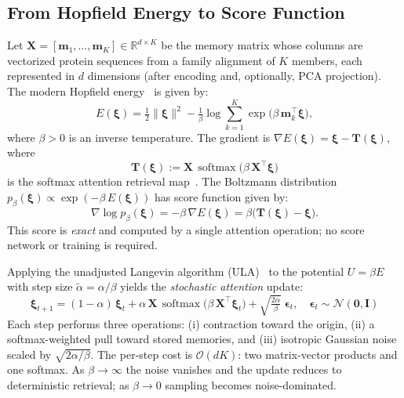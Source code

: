 
\subsection{From Hopfield Energy to Score Function}
Let $\mathbf{X} = [\mathbf{m}_1, \dots, \mathbf{m}_K] \in \mathbb{R}^{d \times K}$ be the memory matrix whose columns are vectorized protein sequences from a family alignment of $K$ members, each represented in $d$ dimensions (after encoding and, optionally, PCA projection). The modern Hopfield energy~\cite{ramsauerHopfieldNetworksAll2021} is given by:
\begin{equation}\label{eq:hopfield-energy}
    E(\boldsymbol{\xi}) = \tfrac{1}{2}\|\boldsymbol{\xi}\|^2 - \tfrac{1}{\beta}\log\sum_{k=1}^{K} \exp\!\bigl(\beta\,\mathbf{m}_k^\top \boldsymbol{\xi}\bigr),
\end{equation}
where $\beta > 0$ is an inverse temperature. The gradient is $\nabla E(\boldsymbol{\xi}) = \boldsymbol{\xi} - \mathbf{T}(\boldsymbol{\xi})$, where
\begin{equation}\label{eq:retrieval-map}
    \mathbf{T}(\boldsymbol{\xi}) := \mathbf{X}\,\operatorname{softmax}\!\bigl(\beta\,\mathbf{X}^\top\boldsymbol{\xi}\bigr)
\end{equation}
is the softmax attention retrieval map~\cite{ramsauerHopfieldNetworksAll2021}. The Boltzmann distribution~\cite{ackeleyLearningAlgorithmBoltzmann1985} $p_\beta(\boldsymbol{\xi}) \propto \exp(-\beta\,E(\boldsymbol{\xi}))$ has score function given by:
\begin{equation}\label{eq:score}
    \nabla \log p_\beta(\boldsymbol{\xi}) = -\beta\,\nabla E(\boldsymbol{\xi}) = \beta\bigl(\mathbf{T}(\boldsymbol{\xi}) - \boldsymbol{\xi}\bigr).
\end{equation}
This score is \emph{exact} and computed by a single attention operation; no score network or training is required.

Applying the unadjusted Langevin algorithm (ULA)~\cite{robertsTweedieExponentialConvergence1996} to the potential $U = \beta E$ with step size $\tilde{\alpha} = \alpha/\beta$ yields the \emph{stochastic attention} update:
\begin{equation}\label{eq:sa-update}
    \boxed{\;
    \boldsymbol{\xi}_{t+1} = (1 - \alpha)\,\boldsymbol{\xi}_t + \alpha\,\mathbf{X}\,\operatorname{softmax}\!\bigl(\beta\,\mathbf{X}^\top\boldsymbol{\xi}_t\bigr) + \sqrt{\tfrac{2\alpha}{\beta}}\;\boldsymbol{\epsilon}_t, \quad \boldsymbol{\epsilon}_t \sim \mathcal{N}(\mathbf{0}, \mathbf{I})
    \;}
\end{equation}
Each step performs three operations: (i) contraction toward the origin, (ii) a softmax-weighted pull toward stored memories, and (iii) isotropic Gaussian noise scaled by $\sqrt{2\alpha/\beta}$. The per-step cost is $\mathcal{O}(dK)$: two matrix-vector products and one softmax. As $\beta \to \infty$ the noise vanishes and the update reduces to deterministic retrieval; as $\beta \to 0$ sampling becomes noise-dominated.

